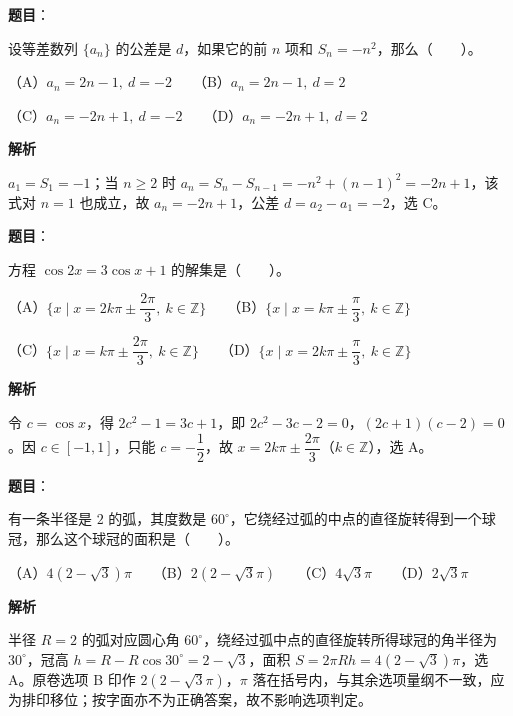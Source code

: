 \begin{answer}

\textbf{题目}：

设等差数列 $\{a_n\}$ 的公差是 $d$，如果它的前 $n$ 项和 $S_n=-n^2$，那么\mbox{（　　）}。

（A）$a_n=2n-1,\ d=-2$　　（B）$a_n=2n-1,\ d=2$

（C）$a_n=-2n+1,\ d=-2$　　（D）$a_n=-2n+1,\ d=2$

\textbf{解析}

$a_1=S_1=-1$；当 $n\ge2$ 时 $a_n=S_n-S_{n-1}=-n^2+(n-1)^2=-2n+1$，该式对 $n=1$ 也成立，故 $a_n=-2n+1$，公差 $d=a_2-a_1=-2$，选 C。


\end{answer}
\begin{answer}

\textbf{题目}：

方程 $\cos2x=3\cos x+1$ 的解集是\mbox{（　　）}。

（A）$\{x\mid x=2k\pi\pm\dfrac{2\pi}{3},\ k\in\mathbb Z\}$　　（B）$\{x\mid x=k\pi\pm\dfrac\pi3,\ k\in\mathbb Z\}$

（C）$\{x\mid x=k\pi\pm\dfrac{2\pi}{3},\ k\in\mathbb Z\}$　　（D）$\{x\mid x=2k\pi\pm\dfrac\pi3,\ k\in\mathbb Z\}$

\textbf{解析}

令 $c=\cos x$，得 $2c^2-1=3c+1$，即 $2c^2-3c-2=0$，$(2c+1)(c-2)=0$。因 $c\in[-1,1]$，只能 $c=-\dfrac12$，故 $x=2k\pi\pm\dfrac{2\pi}{3}$（$k\in\mathbb Z$），选 A。


\end{answer}
\begin{answer}

\textbf{题目}：

有一条半径是 $2$ 的弧，其度数是 $60^\circ$，它绕经过弧的中点的直径旋转得到一个球冠，那么这个球冠的面积是\mbox{（　　）}。

（A）$4(2-\sqrt3)\pi$　　（B）$2(2-\sqrt3\pi)$　　（C）$4\sqrt3\pi$　　（D）$2\sqrt3\pi$

\textbf{解析}

半径 $R=2$ 的弧对应圆心角 $60^\circ$，绕经过弧中点的直径旋转所得球冠的角半径为 $30^\circ$，冠高 $h=R-R\cos30^\circ=2-\sqrt3$，面积 $S=2\pi Rh=4(2-\sqrt3)\pi$，选 A。原卷选项 B 印作 \(2(2-\sqrt3\pi)\)，$\pi$ 落在括号内，与其余选项量纲不一致，应为排印移位；按字面亦不为正确答案，故不影响选项判定。


\end{answer}
